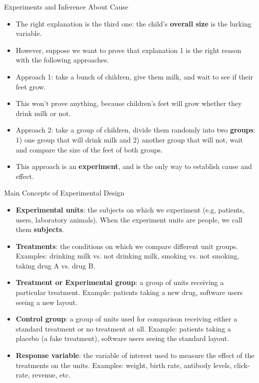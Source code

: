 \documentclass[handout]{beamer}
\begin{document}
\begin{frame}{Experiments and Inference About Cause}
\scriptsize{

\begin{itemize}

\item The right explanation is the third one: the child's \textbf{overall size} is the lurking variable.

 \item However, suppose we want to prove that explanation 1 is the right reason with the following approaches. 
 \item Approach 1: take a bunch of children, give them milk, and wait to see if their feet grow.
 \item This won't prove anything, because children's feet will grow whether they drink milk or not.
 \item Approach 2: take a group of children, divide them randomly into two \textbf{groups}: 1) one group that will drink milk and 2) another group that will not, wait and compare the size of the feet of both groups. 
 \item This approach is an \textbf{experiment}, and is the only way to establish cause and effect.
 
\end{itemize}



} 
\end{frame}


\begin{frame}{Main Concepts of Experimental Design}
\scriptsize{


\begin{itemize}
 \item \textbf{Experimental units}: the subjects on which we experiment (e.g, patients, users, laboratory animals). When the experiment units are people, we call them  \textbf{subjects}.
 \item \textbf{Treatments}: the conditions on which we compare different unit groups. Examples: drinking milk vs. not drinking milk, smoking vs. not smoking, taking drug A vs. drug B.
 \item \textbf{Treatment or Experimental group}: a group of units receiving a particular treatment. Example: patients taking a new drug, software users seeing a new layout.
 \item \textbf{Control group}: a group of units used for comparison receiving either a standard treatment or no treatment at all. Example: patients taking a placebo (a fake treatment), software users seeing the standard layout.
 
  \item \textbf{Response variable}: the variable of interest used to measure the effect of the treatments on the units. Examples: weight, birth rate, antibody levels, click-rate, revenue, etc.
 
\end{itemize}



} 
\end{frame}
\end{document}
